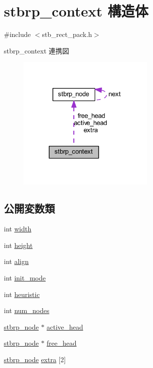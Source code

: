 \hypertarget{structstbrp__context}{}\section{stbrp\+\_\+context 構造体}
\label{structstbrp__context}


{\ttfamily \#include $<$stb\+\_\+rect\+\_\+pack.\+h$>$}



stbrp\+\_\+context 連携図\nopagebreak
\begin{figure}[H]
\begin{center}
\leavevmode
\includegraphics[width=191pt]{structstbrp__context__coll__graph}
\end{center}
\end{figure}
\subsection*{公開変数類}
\begin{DoxyCompactItemize}
\item 
int \mbox{\hyperlink{structstbrp__context_a70cfcb2044ce8397cc440d28b30c09b2}{width}}
\item 
int \mbox{\hyperlink{structstbrp__context_af3715a6f3faecfb4fac8f6ccbb71f9c7}{height}}
\item 
int \mbox{\hyperlink{structstbrp__context_ae36053e2001a725aec2b5756dc990481}{align}}
\item 
int \mbox{\hyperlink{structstbrp__context_a007509feee322404083034e4c2d3dc5d}{init\+\_\+mode}}
\item 
int \mbox{\hyperlink{structstbrp__context_a4b61a7f94e50a54c075e2a8f99f6503a}{heuristic}}
\item 
int \mbox{\hyperlink{structstbrp__context_afa8105d4ef6d3e0ae5aaf8e1ed4b2c58}{num\+\_\+nodes}}
\item 
\mbox{\hyperlink{structstbrp__node}{stbrp\+\_\+node}} $\ast$ \mbox{\hyperlink{structstbrp__context_a13277239636803aff28f00b0a0376120}{active\+\_\+head}}
\item 
\mbox{\hyperlink{structstbrp__node}{stbrp\+\_\+node}} $\ast$ \mbox{\hyperlink{structstbrp__context_a1336ae32373663847866cc65904c2839}{free\+\_\+head}}
\item 
\mbox{\hyperlink{structstbrp__node}{stbrp\+\_\+node}} \mbox{\hyperlink{structstbrp__context_a0b80e1fbdac125427526f3500d4e7624}{extra}} \mbox{[}2\mbox{]}
\end{DoxyCompactItemize}


